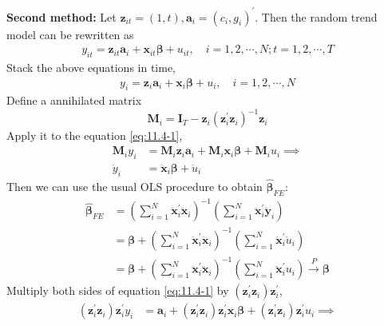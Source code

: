 \begin{enumerate}
\begin{enumerate}
        \textbf{Second method:} Let $\mathbf{z}_{it} = (1,t), \mathbf{a}_i = (c_i, g_i)^\prime$. Then the random trend model can be rewritten as
        \begin{gather*}
            y_{i t}=\mathbf{z}_{it}\mathbf{a}_i+\mathbf{x}_{i t} \boldsymbol{\beta}+u_{i t}, \quad i = 1,2,\cdots,N;t = 1,2,\cdots,T 
        \end{gather*}
        Stack the above equations in time,
        \begin{gather}
            y_{i}=\mathbf{z}_{i}\mathbf{a}_i+\mathbf{x}_{i} \boldsymbol{\beta}+u_{i}, \quad i = 1,2,\cdots,N \label{eq:11.4-1}
        \end{gather}
        Define a annihilated matrix
        \[ \mathbf{M}_i = \mathbf{I}_T - \mathbf{z}_i(\mathbf{z}_i^\prime \mathbf{z}_i )^{-1} \mathbf{z}_i \]
        Apply it to the equation \eqref{eq:11.4-1},
        \begin{align*}
            \mathbf{M}_i y_{i}&=\mathbf{M}_i \mathbf{z}_{i}\mathbf{a}_i+\mathbf{M}_i \mathbf{x}_{i} \boldsymbol{\beta}+\mathbf{M}_i u_{i} \implies \\
            \ddot{y}_i &= \ddot{\mathbf{x}}_i \bm{\beta} + \ddot{u}_i
        \end{align*}
        Then we can use the usual OLS procedure to obtain $\hat{\bm{\beta}}_{FE}$:
        \begin{align*}
            \hat{\boldsymbol{\beta}}_{F E}&=\left(\sum_{i=1}^{N} \ddot{\mathbf{x}}_{i}^{\prime} \ddot{\mathbf{x}}_{i}\right)^{-1}\left(\sum_{i=1}^{N} \ddot{\mathbf{x}}_{i}^{\prime} \ddot{\mathbf{y}}_{i}\right) \\
            &= \bm{\beta} + \left(\sum_{i=1}^{N} \ddot{\mathbf{x}}_{i}^{\prime} \ddot{\mathbf{x}}_{i}\right)^{-1}\left(\sum_{i=1}^{N} \ddot{\mathbf{x}}_{i}^{\prime} \ddot{u}_{i}\right) \\
            &= \bm{\beta} + \left(\sum_{i=1}^{N} \ddot{\mathbf{x}}_{i}^{\prime} \ddot{\mathbf{x}}_{i}\right)^{-1}\left(\sum_{i=1}^{N} \ddot{\mathbf{x}}_{i}^{\prime} u_{i}\right) \xrightarrow{P} \bm{\beta}
        \end{align*}
        Multiply both sides of equation \eqref{eq:11.4-1} by $\left( \mathbf{z}_i^\prime \mathbf{z}_i \right) \mathbf{z}_i^\prime$,
        \begin{align*}
            \left( \mathbf{z}_i^\prime \mathbf{z}_i \right) \mathbf{z}_i^\prime y_i &= \mathbf{a}_i + \left( \mathbf{z}_i^\prime \mathbf{z}_i \right) \mathbf{z}_i^\prime \mathbf{x}_i\bm{\beta} + \left( \mathbf{z}_i^\prime \mathbf{z}_i \right) \mathbf{z}_i^\prime u_i \implies \\

\end{align*}
\end{enumerate}
\end{enumerate}
